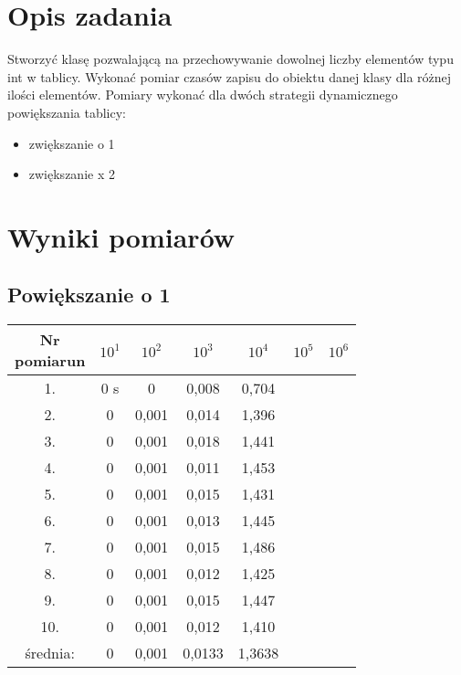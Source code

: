 \documentclass[12pt,a4paper]{article}
\begin{document}
\maketitle
\tableofcontents
\newpage


\section{Opis zadania}
Stworzyć klasę pozwalającą na przechowywanie dowolnej liczby elementów typu int w tablicy. Wykonać pomiar czasów zapisu do obiektu danej klasy dla różnej ilości elementów. Pomiary wykonać dla dwóch strategii dynamicznego powiększania tablicy:
\begin{itemize}
\item zwiększanie o 1
\item zwiększanie x 2
\end{itemize}

\section{Wyniki pomiarów}
\subsection{Powiększanie o 1}
\begin{tabular}{|c|c|c|c|c|c|c|} \hline
\diagbox[width=6em]{Nr \\pomiaru}{n} & $10^1$ & $10^2$ & $10^3$ & $10^4$ & $10^5$ & $10^6$\\ \hline
1. &0 s&0&0,008&0,704&& \\ \hline
2. &0&0,001&0,014&1,396&& \\ \hline
3. &0&0,001&0,018&1,441&& \\ \hline
4. &0&0,001&0,011&1,453&& \\ \hline
5. &0&0,001&0,015&1,431&& \\ \hline
6. &0&0,001&0,013&1,445&& \\ \hline
7. &0&0,001&0,015&1,486&& \\ \hline
8. &0&0,001&0,012&1,425&& \\ \hline
9. &0&0,001&0,015&1,447&& \\ \hline
10. &0&0,001&0,012&1,410&& \\ \hline
średnia: &0&0,001&0,0133&1,3638&& \\ \hline
\end{tabular}
\end{document}
